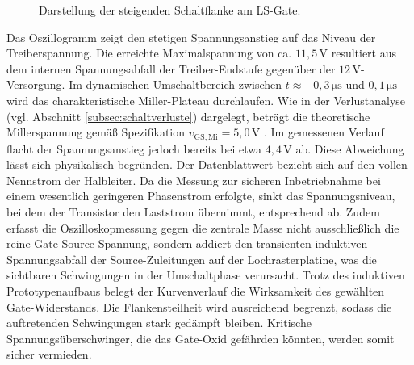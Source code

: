 \begin{figure}[htbp]
    \centering
    \caption{Darstellung der steigenden Schaltflanke am LS-Gate.}
    \label{fig:gate_flanke_csv}
\end{figure}

Das Oszillogramm zeigt den stetigen Spannungsanstieg auf das Niveau der Treiberspannung. Die erreichte Maximalspannung von ca. $11{,}5\,\mathrm{V}$ resultiert aus dem internen Spannungsabfall der Treiber-Endstufe gegenüber der $12\,\mathrm{V}$-Versorgung. 
Im dynamischen Umschaltbereich zwischen $t \approx -0{,}3\,\mathrm{\mu s}$ und $0{,}1\,\mathrm{\mu s}$ wird das charakteristische Miller-Plateau durchlaufen. Wie in der Verlustanalyse (vgl. Abschnitt \ref{subsec:schaltverluste}) dargelegt, beträgt die theoretische Millerspannung gemäß Spezifikation $v_{\mathrm{GS,Mi}} = 5{,}0\,\mathrm{V}$ \cite{DS_IPP034N08N5}. Im gemessenen Verlauf flacht der Spannungsanstieg jedoch bereits bei etwa $4{,}4\,\mathrm{V}$ ab. Diese Abweichung lässt sich physikalisch begründen. Der Datenblattwert bezieht sich auf den vollen Nennstrom der Halbleiter. Da die Messung zur sicheren Inbetriebnahme bei einem wesentlich geringeren Phasenstrom erfolgte, sinkt das Spannungsniveau, bei dem der Transistor den Laststrom übernimmt, entsprechend ab. Zudem erfasst die Oszilloskopmessung gegen die zentrale Masse nicht ausschließlich die reine Gate-Source-Spannung, sondern addiert den transienten induktiven Spannungsabfall der Source-Zuleitungen auf der Lochrasterplatine, was die sichtbaren Schwingungen in der Umschaltphase verursacht.
Trotz des induktiven Prototypenaufbaus belegt der Kurvenverlauf die Wirksamkeit des gewählten Gate-Widerstands. Die Flankensteilheit wird ausreichend begrenzt, sodass die auftretenden Schwingungen stark gedämpft bleiben. Kritische Spannungsüberschwinger, die das Gate-Oxid gefährden könnten, werden somit sicher vermieden.

